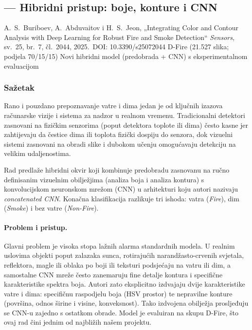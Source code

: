 \subsection{\texorpdfstring{\AutorC}{Zijad Doglod} --- Hibridni pristup: boje, konture i CNN}

\paperbox{\AutorC}
  {A.\ S.\ Buriboev, A.\ Abduvaitov i H.\ S.\ Jeon, „Integrating Color and Contour Analysis with Deep Learning for Robust Fire and Smoke Detection“ \cite{buriboev}}
  {\emph{Sensors}, sv.\ 25, br.\ 7, čl.\ 2044, 2025.\ DOI: 10.3390/s25072044}
  {D-Fire (21.527 slika; podjela 70/15/15)}
  {Novi hibridni model (predobrada + CNN) s eksperimentalnom evaluacijom}

\subsubsection{Sažetak}
Rano i pouzdano prepoznavanje vatre i dima jedan je od ključnih izazova računarske vizije i sistema za nadzor u realnom vremenu. Tradicionalni detektori zasnovani na fizičkim senzorima (poput detektora toplote ili dima) često kasne jer zahtijevaju da čestice dima ili toplota fizički dospiju do senzora, dok vizuelni sistemi zasnovani na obradi slike i dubokom učenju omogućavaju detekciju na velikim udaljenostima.

Rad predlaže hibridni okvir koji kombinuje predobradu zasnovanu na ručno definisanim vizuelnim obilježjima (analiza boja i analiza kontura) s konvolucijskom neuronskom mrežom (CNN) u arhitekturi koju autori nazivaju \emph{concatenated CNN}. Konačna klasifikacija razlikuje tri ishoda: vatra (\emph{Fire}), dim (\emph{Smoke}) i bez vatre (\emph{Non-Fire}).

\paragraph{Problem i pristup.} Glavni problem je visoka stopa lažnih alarma standardnih modela. U realnim uslovima objekti poput zalazaka sunca, rotirajućih narandžasto-crvenih svjetala, reflektora, magle ili oblaka po boji ili teksturi podsjećaju na vatru ili dim, a samostalne CNN mreže često zanemaruju fine detalje kontura i specifične karakteristike spektra boja. Autori zato eksplicitno izdvajaju dvije karakteristike vatre i dima: specifičnu raspodjelu boja (HSV prostor) te nepravilne konture (površina, odnos širine i visine, konveksnost). Tako izdvojena obilježja prosljeđuju se CNN-u zajedno s ostatkom obrade. Model je evaluiran na skupu D-Fire, što ovaj rad čini jednim od najbližih našem projektu.

